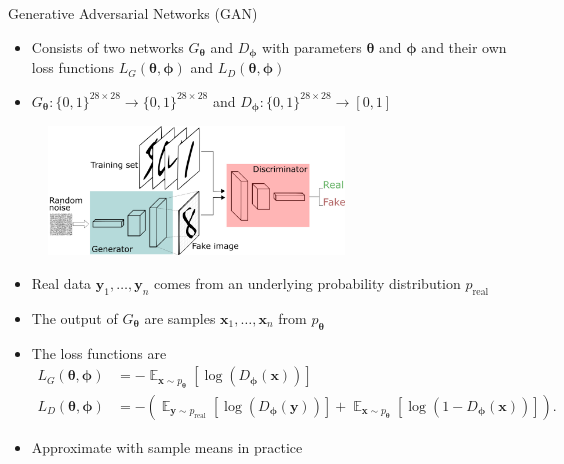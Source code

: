 \documentclass[xcolor=dvipsnames]{beamer}
\DeclareMathOperator*{\E}{\mathbb{E}}
\begin{document}
\begin{frame}{Generative Adversarial Networks (GAN)}

  \begin{itemize}
    \item Consists of two networks $G_{\bm{\theta}}$ and $D_{\bm{\phi}}$ with parameters $\bm{\theta}$ and $\bm{\phi}$ and their own loss functions $L_G(\bm{\theta},\bm{\phi})$ and $L_D(\bm{\theta},\bm{\phi})$
    \item $G_{\bm{\theta}}:\{0,1\}^{28\times 28}\to\{0,1\}^{28\times 28}$ and $D_{\bm{\phi}}:\{0,1\}^{28\times 28}\to [0,1]$
  \end{itemize}

  \begin{figure}
    \centering
    \includegraphics[width=0.7\textwidth]{GANs.png}
  \end{figure}

\end{frame}

\begin{frame}

  \begin{itemize}
    \item Real data $\bm{y}_1,\ldots,\bm{y}_n$ comes from an underlying probability distribution $p_{\text{real}}$
    \item The output of $G_{\bm{\theta}}$ are samples $\bm{x}_1,\ldots,\bm{x}_n$ from $p_{\bm{\theta}}$
    \item The loss functions are 
    \begin{align*}
      L_G(\bm{\theta},\bm{\phi})&=-\E_{\bm{x}\sim p_{\bm{\theta}}}\left[\log(D_{\bm{\phi}}(\bm{x}))\right]\\
      L_D(\bm{\theta},\bm{\phi})&=-\left(\E_{\bm{y}\sim p_{\text{real}}}\left[\log(D_{\bm{\phi}}(\bm{y}))\right]+\E_{\bm{x}\sim p_{\bm{\theta}}}\left[\log(1-D_{\bm{\phi}}(\bm{x}))\right]\right).
    \end{align*}
    \item Approximate with sample means in practice
  \end{itemize}

\end{frame}
  
\end{document}
